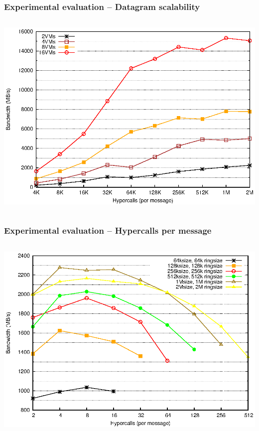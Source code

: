 \documentclass[red,slidestop,notes,compress,mathserif]{beamer}
\begin{document}
\begin{frame}
\frametitle{Experimental evaluation -- Datagram scalability}
\begin{columns}
\includegraphics[width=\textwidth]{figures/bw_dgram_scale.eps}
\end{columns}
\end{frame}

\begin{frame}
\frametitle{Experimental evaluation -- Hypercalls per message}
\begin{columns}
\includegraphics[width=\textwidth]{figures/mix.eps}
\end{columns}
\end{frame}
\end{document}
